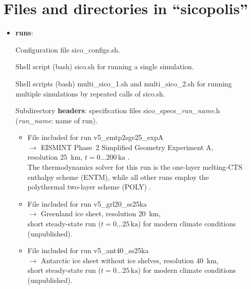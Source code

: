 \documentclass[12pt,a4paper]{article}
\begin{document}



\section{Files and directories in ``sicopolis''}

\begin{itemize}

\item \textbf{runs}:

Configuration file sico\_configs.sh.

Shell script (bash) sico.sh for running a single simulation.

Shell scripts (bash) multi\_sico\_1.sh and multi\_sico\_2.sh for running multiple simulations by repeated calls of sico.sh.

Subdirectory \textbf{headers}: specification files sico\_specs\_\emph{run\_name}.h (\emph{run\_name}: name of run).

\begin{itemize}

\item
File included for run v5\_emtp2sge25\_expA
\\
$\longrightarrow$ EISMINT Phase~2 Simplified Geometry Experiment A,
\\
\phantom{$\longrightarrow$} resolution 25~km, $t=0\ldots{}200\,\mathrm{ka}$ \citep{payne_etal_2000}.
\\
\phantom{$\longrightarrow$} The thermodynamics solver for this run is the one-layer melting-CTS
\\
\phantom{$\longrightarrow$} enthalpy scheme (ENTM), while all other runs employ the 
\\
\phantom{$\longrightarrow$} polythermal two-layer scheme (POLY) \citep{greve_blatter_2016}.

\item
File included for run v5\_grl20\_ss25ka
\\
$\longrightarrow$ Greenland ice sheet, resolution 20~km,
\\
\phantom{$\longrightarrow$} short steady-state run ($t=0\ldots{}25\,\mathrm{ka}$) for modern climate conditions
\\
\phantom{$\longrightarrow$} (unpublished).

\item
File included for run v5\_ant40\_ss25ka
\\
$\longrightarrow$ Antarctic ice sheet without ice shelves, resolution 40~km,
\\
\phantom{$\longrightarrow$} short steady-state run ($t=0\ldots{}25\,\mathrm{ka}$) for modern climate conditions
\\
\phantom{$\longrightarrow$} (unpublished).


\end{itemize}
\end{itemize}
\end{document}
